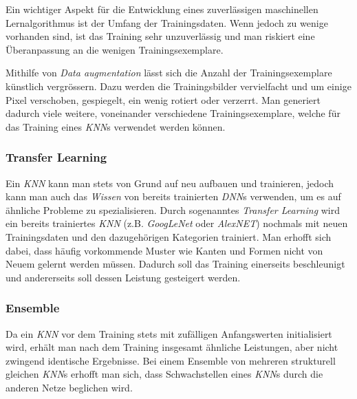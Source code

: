 Ein wichtiger Aspekt für die Entwicklung eines zuverlässigen maschinellen Lernalgorithmus ist der Umfang der Trainingsdaten. Wenn jedoch zu wenige vorhanden sind, ist das Training sehr unzuverlässig und man riskiert eine Überanpassung an die wenigen Trainingsexemplare.

Mithilfe von \textit{Data augmentation} lässt sich die Anzahl der Trainingsexemplare künstlich vergrössern. Dazu werden die Trainingsbilder vervielfacht und um einige Pixel verschoben, gespiegelt, ein wenig rotiert oder verzerrt. Man generiert dadurch viele weitere, voneinander verschiedene Trainingsexemplare, welche für das Training eines \textit{KNN}s verwendet werden können.

\subsubsection{Transfer Learning}

Ein \textit{KNN} kann man stets von Grund auf neu aufbauen und trainieren, jedoch kann man auch das \textit{Wissen} von bereits trainierten \textit{DNN}s verwenden, um es auf ähnliche Probleme zu spezialisieren. Durch sogenanntes \textit{Transfer Learning} wird ein bereits trainiertes \textit{KNN} (z.B. \textit{GoogLeNet} oder \textit{AlexNET}) nochmals mit neuen Trainingsdaten und den dazugehörigen Kategorien trainiert. Man erhofft sich dabei, dass häufig vorkommende Muster wie Kanten und Formen nicht von Neuem gelernt werden müssen. Dadurch soll das Training einerseits beschleunigt und andererseits soll dessen Leistung gesteigert werden.

\subsubsection{Ensemble}

Da ein \textit{KNN} vor dem Training stets mit zufälligen Anfangswerten initialisiert wird, erhält man nach dem Training insgesamt ähnliche Leistungen, aber nicht zwingend identische Ergebnisse. Bei einem Ensemble von mehreren strukturell gleichen \textit{KNN}s erhofft man sich, dass Schwachstellen eines \textit{KNN}s durch die anderen Netze beglichen wird.



















